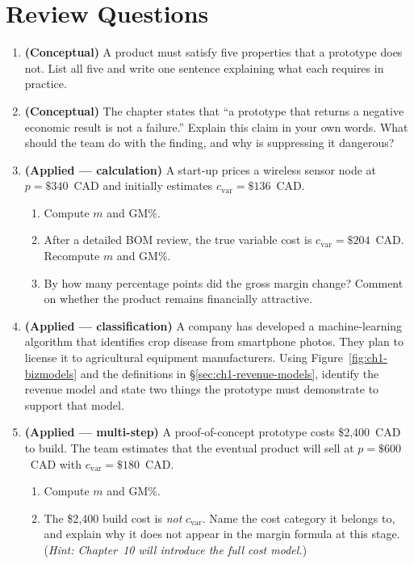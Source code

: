 \section*{Review Questions}

\begin{enumerate}

  \item \textbf{(Conceptual)} A product must satisfy five properties that a
  prototype does not. List all five and write one sentence explaining what each
  requires in practice.

  \item \textbf{(Conceptual)} The chapter states that ``a prototype that returns a
  negative economic result is not a failure.''
  Explain this claim in your own words. What should the team do with the finding,
  and why is suppressing it dangerous?

  \item \textbf{(Applied --- calculation)} A start-up prices a wireless sensor node
  at $p = \$340$~CAD and initially estimates $c_{\text{var}} = \$136$~CAD.
  \begin{enumerate}
    \item Compute $m$ and $\text{GM}$\%.
    \item After a detailed BOM review, the true variable cost is
          $c_{\text{var}} = \$204$~CAD. Recompute $m$ and $\text{GM}$\%.
    \item By how many percentage points did the gross margin change?
          Comment on whether the product remains financially attractive.
  \end{enumerate}

  \item \textbf{(Applied --- classification)} A company has developed a
  machine-learning algorithm that identifies crop disease from smartphone photos.
  They plan to license it to agricultural equipment manufacturers.
  Using Figure~\ref{fig:ch1-bizmodels} and the definitions in §\ref{sec:ch1-revenue-models},
  identify the revenue model and state two things the prototype must demonstrate
  to support that model.

  \item \textbf{(Applied --- multi-step)} A proof-of-concept prototype costs
  \$2{,}400~CAD to build.  The team estimates that the eventual product will sell
  at $p = \$600$~CAD with $c_{\text{var}} = \$180$~CAD.
  \begin{enumerate}
    \item Compute $m$ and $\text{GM}$\%.
    \item The \$2{,}400 build cost is \emph{not} $c_{\text{var}}$.
          Name the cost category it belongs to, and explain why it does not
          appear in the margin formula at this stage.
          (\emph{Hint: Chapter~10 will introduce the full cost model.})
  \end{enumerate}

\end{enumerate}


